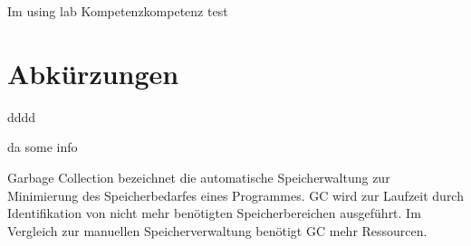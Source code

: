 \documentclass[
12pt,
english,
ngerman,
headsepline,
twoside,
openright,
numbers=noenddot,version=first
]{scrreprt}
\begin{document}
 Im using \gls{lab}
\gls{Kompetenz}kompetenz test


\chapter*{Abkürzungen}











\begin{acronym}[Bash]

 \glqq dddd\grqq{}

\ac{da} some info


\glqq Garbage Collection\grqq{} bezeichnet die automatische Speicherwaltung zur Minimierung des Speicherbedarfes eines Programmes.
\ac{GC} wird zur Laufzeit durch Identifikation von nicht mehr benötigten Speicherbereichen ausgeführt.
Im Vergleich zur manuellen Speicherverwaltung benötigt \ac{GC} mehr Ressourcen.

\end{acronym}
\end{document}
